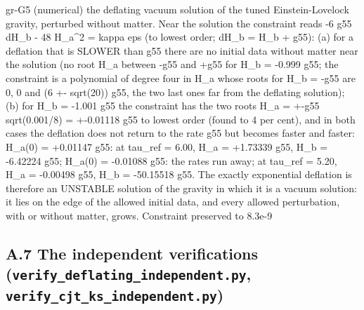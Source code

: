 \documentclass[
  10pt,
]{article}
\newenvironment{Shaded}{}{}
\newcommand{\NormalTok}[1]{#1}
\begin{document}
\begin{Shaded}
\begin{Highlighting}[]
\NormalTok{[PASS] gr{-}G5  (numerical) the deflating vacuum solution of the tuned Einstein{-}Lovelock gravity, perturbed without matter. Near the solution the constraint reads {-}6 g55 dH\_b {-} 48 H\_a\^{}2 = kappa eps (to lowest order; dH\_b = H\_b + g55): (a) for a deflation that is SLOWER than g55 there are no initial data without matter near the solution (no root H\_a between {-}g55 and +g55 for H\_b = {-}0.999 g55; the constraint is a polynomial of degree four in H\_a whose roots for H\_b = {-}g55 are 0, 0 and (6 +{-} sqrt(20)) g55, the two last ones far from the deflating solution); (b) for H\_b = {-}1.001 g55 the constraint has the two roots H\_a = +{-}g55 sqrt(0.001/8) = +{-}0.01118 g55 to lowest order (found to 4 per cent), and in both cases the deflation does not return to the rate g55 but becomes faster and faster: H\_a(0) = +0.01147 g55: at tau\_ref = 6.00, H\_a = +1.73339 g55, H\_b = {-}6.42224 g55; H\_a(0) = {-}0.01088 g55: the rates run away; at tau\_ref = 5.20, H\_a = {-}0.00498 g55, H\_b = {-}50.15518 g55. The exactly exponential deflation is therefore an UNSTABLE solution of the gravity in which it is a vacuum solution: it lies on the edge of the allowed initial data, and every allowed perturbation, with or without matter, grows. Constraint preserved to 8.3e{-}9}
\end{Highlighting}
\end{Shaded}

\hypertarget{a.7-the-independent-verifications-verify_deflating_independent.py-verify_cjt_ks_independent.py}{%
\subsection{\texorpdfstring{A.7 The independent verifications
(\texttt{verify\_deflating\_independent.py},
\texttt{verify\_cjt\_ks\_independent.py})}{A.7 The independent verifications (verify\_deflating\_independent.py, verify\_cjt\_ks\_independent.py)}}\label{a.7-the-independent-verifications-verify_deflating_independent.py-verify_cjt_ks_independent.py}}
\end{document}
